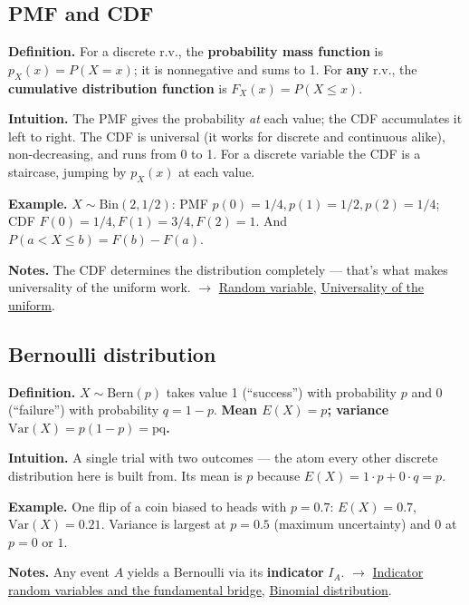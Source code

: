 \documentclass[11pt,a4paper]{article}
\begin{document}
\subsection{PMF and CDF}\label{sec:pmf-and-cdf}

\textbf{Definition.} For a discrete r.v., the \textbf{probability mass function} is $p_X(x) = P(X = x)$; it is nonnegative and sums to 1. For \textbf{any} r.v., the \textbf{cumulative distribution function} is $F_X(x) = P(X \leq  x)$.

\textbf{Intuition.} The PMF gives the probability \textit{at} each value; the CDF accumulates it left to right. The CDF is universal (it works for discrete and continuous alike), non-decreasing, and runs from 0 to 1. For a discrete variable the CDF is a staircase, jumping by $p_X(x)$ at each value.

\textbf{Example.} $X \sim \mathrm{Bin}(2, 1/2)$: PMF $p(0)=1/4, p(1)=1/2, p(2)=1/4$; CDF $F(0)=1/4, F(1)=3/4, F(2)=1$. And $P(a < X \leq  b) = F(b) - F(a)$.

\textbf{Notes.} The CDF determines the distribution completely --- that's what makes universality of the uniform work. $\to$ \hyperref[sec:random-variable]{Random variable}, \hyperref[sec:universality-of-the-uniform]{Universality of the uniform}.

\subsection{Bernoulli distribution}\label{sec:bernoulli-distribution}

\textbf{Definition.} $X \sim \mathrm{Bern}(p)$ takes value 1 (``success'') with probability $p$ and 0 (``failure'') with probability $q = 1 - p$. \textbf{Mean $E(X) = p$; variance $\mathrm{Var}(X) = p(1-p) = \text{pq}$.}

\textbf{Intuition.} A single trial with two outcomes --- the atom every other discrete distribution here is built from. Its mean is $p$ because $E(X) = 1\cdot p + 0\cdot q = p$.

\textbf{Example.} One flip of a coin biased to heads with $p = 0.7$: $E(X) = 0.7$, $\mathrm{Var}(X) = 0.21$. Variance is largest at $p = 0.5$ (maximum uncertainty) and 0 at $p = 0$ or $1$.

\textbf{Notes.} Any event $A$ yields a Bernoulli via its \textbf{indicator} $I_A$. $\to$ \hyperref[sec:indicator-random-variables-and-the-fundamental-bridge]{Indicator random variables and the fundamental bridge}, \hyperref[sec:binomial-distribution]{Binomial distribution}.
\end{document}
